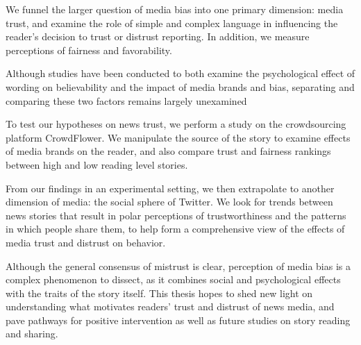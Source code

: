 We funnel the larger question of media bias into one primary dimension: media trust, and examine the role of simple and complex language in influencing the reader's decision to trust or distrust reporting. In addition, we measure perceptions of fairness and favorability. 

Although studies have been conducted to both examine the psychological effect of wording on believability and the impact of media brands and bias, separating and comparing these two factors remains largely unexamined \cite{weisberg2008seductive, baum2008eye}

To test our hypotheses on news trust, we perform a study on the crowdsourcing platform CrowdFlower. We manipulate the source of the story to examine effects of media brands on the reader, and also compare trust and fairness rankings between high and low reading level stories.

From our findings in an experimental setting, we then extrapolate to another dimension of media: the social sphere of Twitter. We look for trends between news stories that result in polar perceptions of trustworthiness and the patterns in which people share them, to help form a comprehensive view of the effects of media trust and distrust on behavior.

Although the general consensus of mistrust is clear, perception of media bias is a complex phenomenon to dissect, as it combines social and psychological effects with the traits of the story itself. This thesis hopes to shed new light on understanding what motivates readers' trust and distrust of news media, and pave pathways for positive intervention as well as future studies on story reading and sharing.
 

 